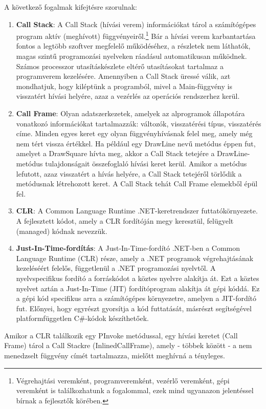 \documentclass[tocnopagenum]{thesis-ekf}
\theoremstyle{definition}
\theoremstyle{remark}
\begin{document}
	A következő fogalmak kifejtésre szorulnak:
	\begin{enumerate}
		\item \textbf{Call Stack}: A Call Stack (hívási verem) információkat tárol a számítógépes program aktív (meghívott) függvényeiről.\footnote{Végrehajtási veremként, programveremként, vezérlő veremként, gépi veremként is találkozhatunk a fogalommal, ezek mind ugyanazon jelentéssel bírnak a fejlesztők körében.} Bár a hívási verem karbantartása fontos a legtöbb szoftver megfelelő működéséhez, a részletek nem láthatók, magas szintű programozási nyelveken ráadásul automatikusan működnek. Számos processzor utasításkészlete eltérő utasításokat tartalmaz a programverem kezelésére. Amennyiben a Call Stack üressé válik, azt mondhatjuk, hogy kiléptünk a programból, mivel a Main-függvény is visszatért hívási helyére, azaz a vezérlés az operációs rendszerhez kerül.
		\cite{callstack}
		\item \textbf{Call Frame}: Olyan adatszerkezetek, amelyek az alprogramok állapotára vonatkozó információkat tartalmazzák: változók, visszatérési típus, visszatérés címe. Minden egyes keret egy olyan függvényhívásnak felel meg, amely még nem tért vissza értékkel. Ha például egy DrawLine nevű metódus éppen fut, amelyet a DrawSquare hívta meg, akkor a Call Stack tetejére a DrawLine-metódus tulajdonságait összefoglaló hívási keret kerül. Amikor a metódus lefutott, azaz visszatért a hívás helyére, a Call Stack tetejéről törlődik a metódusnak létrehozott keret. A Call Stack tehát Call Frame elemekből épül fel.
		\cite{callstack}
		\item \textbf{CLR}: A Common Language Runtime .NET-keretrendszer futtatókörnyezete. A fejlesztett kódot, amely a CLR fordítóján megy keresztül, felügyelt (managed) kódnak nevezzük.
		\cite{clr}
		\item \textbf{Just-In-Time-fordítás}: A Just-In-Time-fordító .NET-ben a Common Language Runtime (CLR) része, amely a .NET programok végrehajtásának kezeléséért felelős, függetlenül a .NET programozási nyelvtől. A nyelvspecifikus fordító a forráskódot a köztes nyelvre alakítja át. Ezt a köztes nyelvet aztán a Just-In-Time (JIT) fordítóprogram alakítja át gépi kóddá. Ez a gépi kód specifikus arra a számítógépes környezetre, amelyen a JIT-fordító fut. Előnyei, hogy egyrészt gyorsítja a kód futtatását, másrészt segítségével platformfüggetlen C\#-kódok készíthetőek.
		\cite{jit_compiler}
	\end{enumerate}
	
	Amikor a CLR találkozik egy PInvoke metódussal, egy hívási keretet (Call Frame) tárol a Call Stackre (InlinedCallFrame), amely - többek között - a nem menedzselt függvény címét tartalmazza, mielőtt meghívná a tényleges.
	
\end{document}
